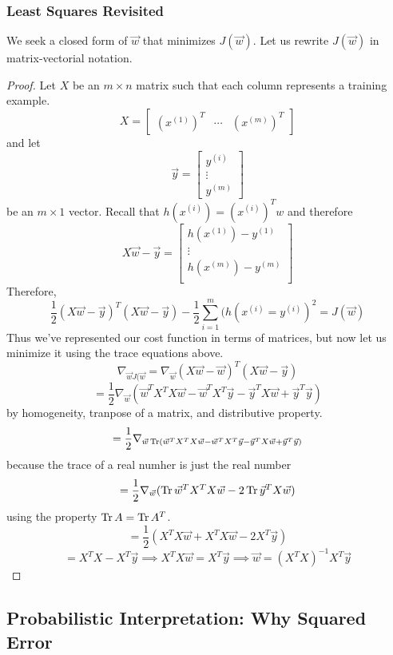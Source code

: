 \documentclass[12pt]{scrartcl}
\begin{document}
\subsubsection{Least Squares Revisited}

We seek a closed form of $\vec{w}$ that minimizes $J(\vec{w})$. Let us rewrite $J(\vec{w})$ in matrix-vectorial notation.

\begin{proof}
    Let $X$ be an $m \times n$ matrix such that each column represents a training example.
    \[X = \begin{bmatrix}
        (x^{(1)})^T & \cdots & (x^{(m)})^T
    \end{bmatrix}\] and let \[\vec{y} = \begin{bmatrix}
        y^{(i)} \\
        \vdots \\
        y^{(m)}
    \end{bmatrix}\]
    be an $m \times 1$ vector.
Recall that $h(x^{(i)}) = (x^{(i)})^Tw$ and therefore
\[X\vec{w} - \vec{y} = \begin{bmatrix}
    h(x^{(1)}) - y^{(1)}\\
    \vdots\\
    h(x^{(m)}) - y^{(m)}\\
\end{bmatrix}\]
Therefore,
\[\frac{1}{2}(X\vec{w}-\vec{y})^T(X\vec{w} - \vec{y}) - \frac{1}{2}\sum_{i=1}^m (h(x^{(i)} = y^{(i)})^2 = J(\vec{w})\]
Thus we've represented our cost function in terms of matrices, but now let us minimize it using the trace equations above.
\[\nabla_{\vec{w}J(\vec{w}} = \nabla_{\vec{w}}(X\vec{w} - \vec{w})^T(X\vec{w} - \vec{y})\]
\[ = \frac{1}{2}\nabla_{\vec{w}} (\vec{w}^TX^T X\vec{w} - \vec{w}^T X^T \vec{y} -\vec{y}^TX\vec{w} + \vec{y}^T\vec{y})\]
by homogeneity, tranpose of a matrix, and distributive property.
\[= \frac{1}{2}\nabla_{\vec{w} \operatorname{Tr} (\vec{w}^TX^T X\vec{w} - \vec{w}^T X^T \vec{y} -\vec{y}^TX\vec{w} + \vec{y}^T\vec{y})}\] because the trace of a real numher is just the real number
\[= \frac{1}{2}\nabla_{\vec{w}}(\operatorname{Tr} \vec{w}^TX^TX\vec{w} - 2\operatorname{Tr}\vec{y}^TX\vec{w})\]
using the property $\operatorname{Tr} A = \operatorname{Tr} A^T$.
\[= \frac{1}{2}(X^TX\vec{w} + X^TX\vec{w} - 2X^T\vec{y})\]
\[= X^TX - X^T\vec{y} \implies X^TX\vec{w} = X^T\vec{y} \implies \vec{w} = (X^TX)^{-1}X^T\vec{y}\]
\end{proof}

\subsection{Probabilistic Interpretation: Why Squared Error}
\end{document}
